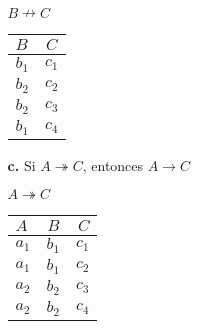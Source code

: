 \documentclass[12pt, letterpaper]{article}
\begin{document}
\begin{itemize}
\begin{itemize}
\begin{multicols}{3}
                                        $B \nrightarrow C$    
                                        \begin{tabular}{| l | c | }
                                            \hline
                                            $B$ & $C$ \\
                                            \hline 
                                            $b_{1}$ & $c_{1}$ \\
                                            $b_{2}$ & $c_{2}$ \\
                                            $b_{2}$ & $c_{3}$ \\
                                            $b_{1}$ & $c_{4}$ \\
                                            \hline
                                        \end{tabular}

                                \end{multicols}
                                

            \item[\textbf{c.}]  Si $A \twoheadrightarrow C$, 
                                entonces $A \rightarrow C$

                                \begin{multicols}{2}
                                    
                                    $A \twoheadrightarrow C$
                                        \begin{tabular}{| l | c | r |}
                                            \hline
                                            $A$ & $B$ &$C$ \\
                                            \hline 
                                            $a_{1}$ & $b_{1}$ & $c_{1}$ \\
                                            $a_{1}$ & $b_{1}$ & $c_{2}$ \\
                                            $a_{2}$ & $b_{2}$ & $c_{3}$ \\
                                            $a_{2}$ & $b_{2}$ & $c_{4}$ \\
                                            \hline
                                        \end{tabular}
                                        

\end{multicols}
\end{itemize}
\end{itemize}
\end{document}
